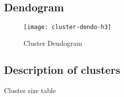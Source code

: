 \begin{landscape}

\subsection{Dendogram}%
\label{sub:dendogram}


\begin{figure}[H]
    \centering
    \texttt{[image: cluster-dendo-h3]}
    \caption{Cluster Dendogram}%
    \label{fig:dendogram-final}
\end{figure}

\end{landscape}



\subsection{Description of clusters}%
\label{sub:description_of_clusters}

\begin{table}[H]
\centering
\caption{Cluster size table}%
\label{tab:cluster_size}

\end{table}


